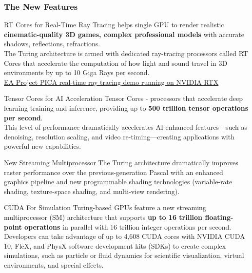 \documentclass[xcolor=x11names,table]{beamer}
\begin{document}
    \begin{frame}[allowframebreaks]
    \frametitle{The New Features}
        \begin{block}{RT Cores for Real-Time Ray Tracing}
        {\small helps single GPU to render realistic \textbf{cinematic-quality 3D games, complex professional models} with accurate shadows, reflections, refractions.
        \\ The Turing architecture is armed with dedicated ray-tracing processors called RT Cores that accelerate the computation of how light and sound travel in 3D environments by up to 10 Giga Rays per second.
        \\ \href{https://www.youtube.com/watch?v=LXo0WdlELJk}{EA Project PICA real-time ray tracing demo running on NVIDIA RTX}}
        \end{block}
        
        \begin{block}{Tensor Cores for AI Acceleration}
        {\small Tensor Cores - processors that accelerate deep learning training and inference, providing up to \textbf{500 trillion tensor operations per second}.
        \\ This level of performance dramatically accelerates AI-enhanced features—such as denoising, resolution scaling, and video re-timing—creating applications with powerful new capabilities.}
        \end{block}
        
        \begin{block}{New Streaming Multiprocessor}
        {\small The Turing architecture dramatically improves raster performance over the previous-generation Pascal with an enhanced graphics pipeline and new programmable shading technologies (variable-rate shading, texture-space shading, and multi-view rendering).
        }
        \end{block}
        
        \begin{block}{CUDA For Simulation}
        {\small Turing-based GPUs feature a new streaming multiprocessor (SM) architecture that supports \textbf{up to 16 trillion floating-point operations} in parallel with 16 trillion integer operations per second. 
        \\ Developers can take advantage of up to 4,608 CUDA cores with NVIDIA CUDA 10, FleX, and PhysX software development kits (SDKs) to create complex simulations, such as particle or fluid dynamics for scientific visualization, virtual environments, and special effects.}
        \end{block}
    \end{frame}
\end{document}
